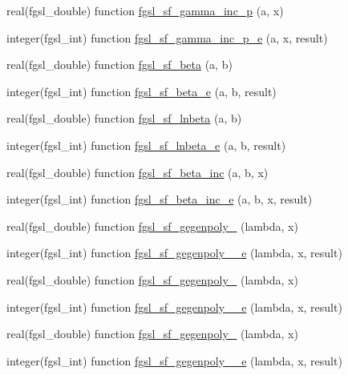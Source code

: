 \begin{DoxyCompactItemize}
\item 
real(fgsl\-\_\-double) function \hyperlink{specfunc_8finc_acb9d3ffcf38260a1cb629bc3cdad20fe}{fgsl\-\_\-sf\-\_\-gamma\-\_\-inc\-\_\-p} (a, x)
\item 
integer(fgsl\-\_\-int) function \hyperlink{specfunc_8finc_a15c354c5d960189a152fe6f30725ff75}{fgsl\-\_\-sf\-\_\-gamma\-\_\-inc\-\_\-p\-\_\-e} (a, x, result)
\item 
real(fgsl\-\_\-double) function \hyperlink{specfunc_8finc_aa79e39f5567af8b628834fb638933f38}{fgsl\-\_\-sf\-\_\-beta} (a, b)
\item 
integer(fgsl\-\_\-int) function \hyperlink{specfunc_8finc_a22f4a85b4d7a1d80ca0154875042bb7e}{fgsl\-\_\-sf\-\_\-beta\-\_\-e} (a, b, result)
\item 
real(fgsl\-\_\-double) function \hyperlink{specfunc_8finc_abc0af8d0d6c3904815ed1e74467e1144}{fgsl\-\_\-sf\-\_\-lnbeta} (a, b)
\item 
integer(fgsl\-\_\-int) function \hyperlink{specfunc_8finc_af3a95042172ed33f922f0c3e24fca696}{fgsl\-\_\-sf\-\_\-lnbeta\-\_\-e} (a, b, result)
\item 
real(fgsl\-\_\-double) function \hyperlink{specfunc_8finc_a5530256039c61d1851614d87d23f5217}{fgsl\-\_\-sf\-\_\-beta\-\_\-inc} (a, b, x)
\item 
integer(fgsl\-\_\-int) function \hyperlink{specfunc_8finc_a75c70bd54700019f07ed1032bbb01041}{fgsl\-\_\-sf\-\_\-beta\-\_\-inc\-\_\-e} (a, b, x, result)
\item 
real(fgsl\-\_\-double) function \hyperlink{specfunc_8finc_ad13551ab56b61fef8c1ad859db6a587f}{fgsl\-\_\-sf\-\_\-gegenpoly\-\_} (lambda, x)
\item 
integer(fgsl\-\_\-int) function \hyperlink{specfunc_8finc_aa644625cd39347bf093362807bbca584}{fgsl\-\_\-sf\-\_\-gegenpoly\-\_\-\_\-e} (lambda, x, result)
\item 
real(fgsl\-\_\-double) function \hyperlink{specfunc_8finc_acb63c00b5218df04dc6c416a8520c266}{fgsl\-\_\-sf\-\_\-gegenpoly\-\_} (lambda, x)
\item 
integer(fgsl\-\_\-int) function \hyperlink{specfunc_8finc_ad85f6557dac4edb6b33bba6aba5bab2a}{fgsl\-\_\-sf\-\_\-gegenpoly\-\_\-\_\-e} (lambda, x, result)
\item 
real(fgsl\-\_\-double) function \hyperlink{specfunc_8finc_aa1b13aeb26a6ee235072177a9b63abf0}{fgsl\-\_\-sf\-\_\-gegenpoly\-\_} (lambda, x)
\item 
integer(fgsl\-\_\-int) function \hyperlink{specfunc_8finc_a0258d23ae548968fb79d4508cd0b3fca}{fgsl\-\_\-sf\-\_\-gegenpoly\-\_\-\_\-e} (lambda, x, result)

\end{DoxyCompactItemize}
